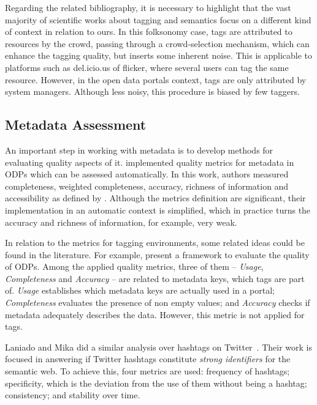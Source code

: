 Regarding the related bibliography, it is necessary to highlight that the vast majority of scientific works about tagging and semantics focus on a different kind of context in relation to ours.
In this folksonomy case, tags are attributed to resources by the crowd, passing through a crowd-selection mechanism, which can enhance the tagging quality, but inserts some inherent noise.
This is applicable to platforms such as del.icio.us of flicker, where several users can tag the same resource.
However, in the open data portals context, tags are only attributed by system managers.
Although less noisy, this procedure is biased by few taggers.

\subsection{Metadata Assessment}
\label{sec:metadata_assessment}

An important step in working with metadata is to develop methods for evaluating quality aspects of it.
 implemented quality metrics for metadata in ODPs which can be assessed automatically.
In this work, authors measured completeness, weighted completeness, accuracy, richness of information and accessibility as defined by .
Although the metrics definition are significant, their implementation in an automatic context is simplified, which in practice turns the accuracy and richness of information, for example, very weak.

In relation to the metrics for tagging environments, some related ideas could be found in the literature.
For example,  present a framework to evaluate the quality of ODPs. 
Among the applied quality metrics, three of them -- \emph{Usage}, \emph{Completeness} and \emph{Accuracy} -- are related to metadata keys, which tags are part of. 
\emph{Usage} establishes which metadata keys are actually used in a portal; \emph{Completeness} evaluates the presence of non empty values; and \emph{Accuracy} checks if metadata adequately describes the data.
However, this metric is not applied for tags.

Laniado and Mika did a similar analysis over hashtags on Twitter~\cite{Laniado2010}.
Their work is focused in answering if Twitter hashtags constitute \emph{strong identifiers} for the semantic web. 
To achieve this, four metrics are used: frequency of hashtags; specificity, which is the deviation from the use of them without being a hashtag; consistency; and stability over time.

